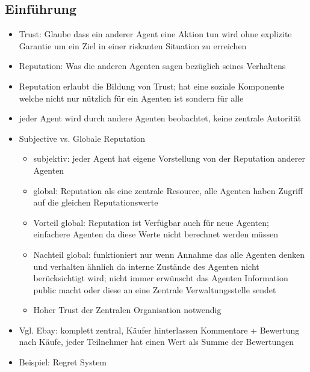 \documentclass{article} %
\begin{document}
	\subsection{Einführung}
	\begin{itemize}
		\item Trust: Glaube dass ein anderer Agent eine Aktion tun wird ohne explizite Garantie um ein Ziel in einer riskanten Situation zu erreichen
		\item Reputation: Was die anderen Agenten sagen bezüglich seines Verhaltens
		\item Reputation erlaubt die Bildung von Trust; hat eine soziale Komponente welche nicht nur nützlich für ein Agenten ist sondern für alle
		\item jeder Agent wird durch andere Agenten beobachtet, keine zentrale Autorität
		\item Subjective vs. Globale Reputation
		\begin{itemize}
			\item subjektiv: jeder Agent hat eigene Vorstellung von der Reputation anderer Agenten
			\item global: Reputation als eine zentrale Resource, alle Agenten haben Zugriff auf die gleichen Reputationswerte
			\item Vorteil global: Reputation ist Verfügbar auch für neue Agenten; einfachere Agenten da diese Werte nicht berechnet werden müssen
			\item Nachteil global: funktioniert nur wenn Annahme das alle Agenten denken und verhalten ähnlich da interne Zustände des Agenten nicht berücksichtigt wird; nicht immer erwünscht das Agenten Information public macht oder diese an eine Zentrale Verwaltungsstelle sendet
			\item Hoher Trust der Zentralen Organisation notwendig
		\end{itemize}
		\item Vgl. Ebay: komplett zentral, Käufer hinterlassen Kommentare + Bewertung nach Käufe, jeder Teilnehmer hat einen Wert als Summe der Bewertungen
		\item Beispiel: Regret System
	\end{itemize}
\end{document}
